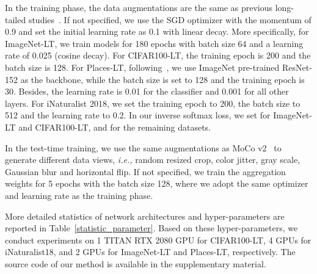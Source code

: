 \documentclass{article}
\def\ie{\emph{i.e.}} \def\Ie{\emph{I.e.}}
\def\ie{\emph{i.e., }}
\begin{document}
In the training phase,  the data augmentations are the same as previous long-tailed studies~\cite{hong2020disentangling,kang2019decoupling}. If not specified, we use the SGD optimizer with the momentum of 0.9 and set the initial learning rate as 0.1 with linear  decay. More specifically, for ImageNet-LT, we train models for 180 epochs with batch size 64 and a learning rate of 0.025 (cosine  decay). For CIFAR100-LT,  the  training epoch is 200 and the batch size is 128. For Places-LT, following~\cite{liu2019large}, we use  ImageNet pre-trained ResNet-152     as the backbone, while the batch size is set to 128 and the training epoch  is 30. Besides, the learning rate  is   0.01 for the classifier and   0.001 for all other layers. For iNaturalist 2018, we set   the  training epoch to 200, the batch size to 512 and the learning rate to 0.2.
In our inverse softmax loss, we set  for ImageNet-LT and CIFAR100-LT, and     for the remaining    datasets. 

In the test-time training, we use the same augmentations as MoCo v2~\cite{chen2020improved} to generate different data views, \ie random resized crop, color jitter, gray scale, Gaussian  blur and horizontal flip. If not specified, we train the aggregation weights for 5 epochs with the batch size 128, where we adopt  the same optimizer and learning rate as the training phase.  

More detailed statistics of network architectures and  hyper-parameters are reported in Table~\ref{statistic_parameter}. 
Based on these hyper-parameters, we conduct   experiments on 1  TITAN RTX 2080  GPU for CIFAR100-LT, 4 GPUs for iNaturalist18, and 2 GPUs for ImageNet-LT and Places-LT, respectively. The source code of our method is available in the supplementary material.  
  
\end{document}
